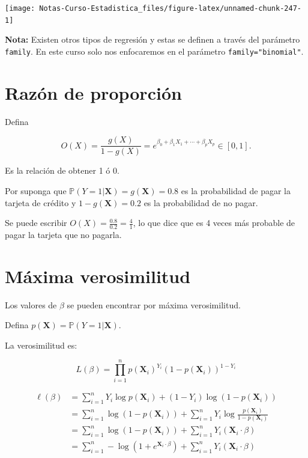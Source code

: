 \documentclass[
  12pt,
]{book}
\theoremstyle{definition}
\theoremstyle{definition}
\theoremstyle{definition}
\theoremstyle{remark}
\begin{document}
\begin{center}\texttt{[image: Notas-Curso-Estadistica\_files/figure-latex/unnamed-chunk-247-1]} \end{center}

\textbf{Nota:} Existen otros tipos de regresión y estas se definen a través del parámetro \texttt{family}. En este curso solo nos enfocaremos en el parámetro \texttt{family="binomial"}.

\hypertarget{razuxf3n-de-proporciuxf3n}{%
\section{Razón de proporción}\label{razuxf3n-de-proporciuxf3n}}

Defina

\begin{equation*}
O(X) = \frac{g(X)}{1-g(X)} = e^{\beta_{0} +\beta_{1} X_{1} + \cdots + \beta_{p} X_{p}} \in [0,1].
\end{equation*}

Es la relación de obtener 1 ó 0.

Por suponga que \(\mathbb{P}\left(Y=1\vert \boldsymbol{X}\right) = g(\boldsymbol{X}) = 0.8\) es la probabilidad de pagar la tarjeta de crédito y \(1-g(\boldsymbol{X}) = 0.2\) es la probabilidad de no pagar.

Se puede escribir \(O(X) = \frac{0.8}{0.2} = \frac{4}{1}\), lo que dice que es 4 veces más probable de pagar la tarjeta que no pagarla.

\hypertarget{muxe1xima-verosimilitud}{%
\section{Máxima verosimilitud}\label{muxe1xima-verosimilitud}}

Los valores de \(\beta\) se pueden encontrar por máxima verosimilitud.

Defina \(p(\boldsymbol{X}) = \mathbb{P}\left(Y=1\vert \boldsymbol{X}\right)\).

La verosimilitud es:

\[
L\left(\beta\right)=\prod_{i=1}^{n} p\left(\boldsymbol{X}_{i}\right)^{Y_{i}}\left(1-p\left(\boldsymbol{X}_{i}\right)\right)^{1-Y_{i}}
\]

\begin{align*}
\ell\left(\beta\right) 
&=\sum_{i=1}^{n} Y_{i} \log p\left(\boldsymbol{X}_{i}\right)+\left(1-Y_{i}\right) \log \left(1-p\left(\boldsymbol{X}_{i}\right)\right) \\
&=\sum_{i=1}^{n} \log \left(1-p\left(\boldsymbol{X}_{i}\right)\right)+\sum_{i=1}^{n} Y_{i} \log \frac{p\left(\boldsymbol{X}_{i}\right)}{1-p\left(\boldsymbol{X}_{i}\right)} \\
&=\sum_{i=1}^{n} \log \left(1-p\left(\boldsymbol{X}_{i}\right)\right)+\sum_{i=1}^{n} Y_{i}\left(\boldsymbol{X}_{i} \cdot \beta\right) \\
&=\sum_{i=1}^{n}-\log \left(1+e^{\boldsymbol{X}_{i} \cdot \beta}\right)+\sum_{i=1}^{n} Y_{i}\left(\boldsymbol{X}_{i} \cdot \beta\right)
\end{align*}
\end{document}

